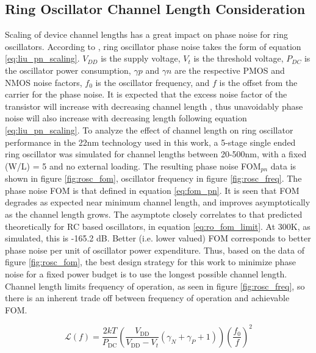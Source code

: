 \FloatBarrier


\subsection{Ring Oscillator Channel Length Consideration}\label{sec:chan_len_22fdx}
	Scaling of device channel lengths has a great impact on phase noise for ring oscillators. According to \cite{Liu2020}, ring oscillator phase noise takes the form of equation \ref{eq:liu_pn_scaling}. $V_{DD}$ is the supply voltage, $V_t$ is the threshold voltage, $P_{DC}$ is the oscillator power consumption, $\gamma p$ and $\gamma n$ are the respective PMOS and NMOS noise factors, $f_0$ is the oscillator frequency, and $f$ is the offset from the carrier for the phase noise. It is expected that the excess noise factor of the transistor will increase with decreasing channel length \cite{Antonopoulos2013}, thus unavoidably phase noise will also increase with decreasing length following equation \ref{eq:liu_pn_scaling}. To analyze the effect of channel length on ring oscillator performance in the 22nm technology used in this work, a 5-stage single ended ring oscillator was simulated for channel lengths between 20-500nm, with a fixed (W/L) = 5 and no external loading. The resulting phase noise FOM$_{pn}$ data is shown in figure \ref{fig:rosc_fom}, oscillator frequency in figure \ref{fig:rosc_freq}. The phase noise FOM is that defined in equation \ref{eq:fom_pn}. It is seen that FOM degrades as expected near minimum channel length, and improves asymptotically as the channel length grows. The asymptote closely correlates to that predicted theoretically for RC based oscillators, in equation \ref{eq:ro_fom_limit}. At 300K, as simulated, this is -165.2 dB. Better (i.e. lower valued) FOM corresponds to better phase noise per unit of oscillator power expenditure. Thus, based on the data of figure \ref{fig:rosc_fom}, the best design strategy for this work to minimize phase noise for a fixed power budget is to use the longest possible channel length. Channel length limits frequency of operation, as seen in figure \ref{fig:rosc_freq}, so there is an inherent trade off between frequency of operation and achievable FOM. 

	\begin{equation} \label{eq:liu_pn_scaling}
		\mathcal {L}(f) =\frac {2kT}{P_{\textrm {DC}}}\left ({\frac {V_{\textrm {DD}}}{V_{\textrm {DD}}-V_{t}} (\gamma _{N}+\gamma _{P}+1)}\right)\left ({\frac {f_{0}}{f}}\right)^{2}
	\end{equation}

